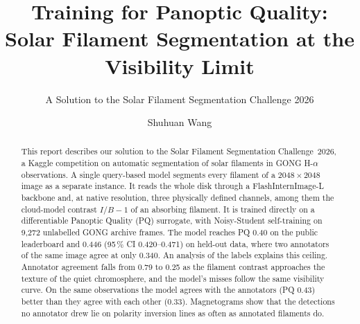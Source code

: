 \documentclass[sigconf]{acmart}
\begin{document}
\title{Training for Panoptic Quality: Solar Filament Segmentation at the Visibility Limit}
\subtitle{A Solution to the Solar Filament Segmentation Challenge 2026} %

\author{Shuhuan Wang}

\begin{abstract}
    This report describes our solution to the Solar Filament Segmentation Challenge~2026, a Kaggle competition on automatic segmentation of solar filaments in GONG H-$\alpha$ observations. A single query-based model segments every filament of a $2048\times2048$ image as a separate instance. It reads the whole disk through a FlashInternImage-L backbone and, at native resolution, three physically defined channels, among them the cloud-model contrast $I/B-1$ of an absorbing filament. It is trained directly on a differentiable Panoptic Quality (PQ) surrogate, with Noisy-Student self-training on 9,272 unlabelled GONG archive frames. The model reaches PQ 0.40 on the public leaderboard and 0.446 (95\,\% CI 0.420--0.471) on held-out data, where two annotators of the same image agree at only 0.340. An analysis of the labels explains this ceiling. Annotator agreement falls from 0.79 to 0.25 as the filament contrast approaches the texture of the quiet chromosphere, and the model's misses follow the same visibility curve. On the same observations the model agrees with the annotators (PQ 0.43) better than they agree with each other (0.33). Magnetograms show that the detections no annotator drew lie on polarity inversion lines as often as annotated filaments do.
\end{abstract}

\maketitle



\end{document}
